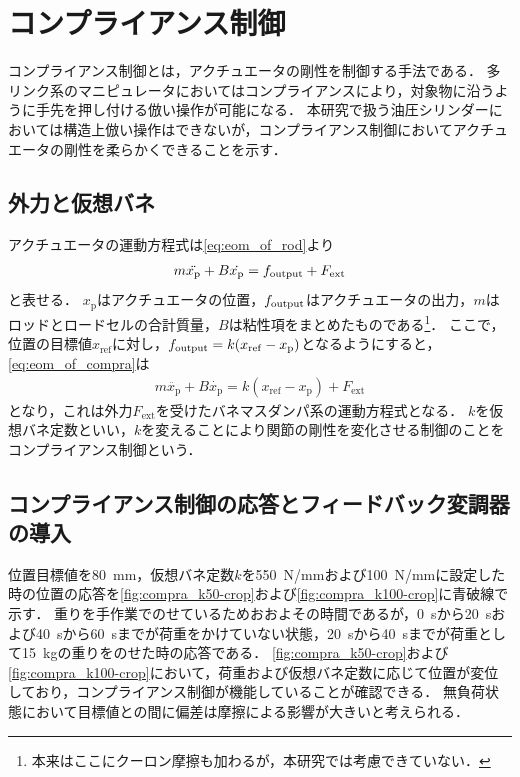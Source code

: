 \clearpage
\section{コンプライアンス制御}
コンプライアンス制御とは，アクチュエータの剛性を制御する手法である\cite{松野_大須賀_松原_野田_稲見201712,吉川198811,谷江和雄1989コンプライアンス制御と柔軟接触問題}．
多リンク系のマニピュレータにおいてはコンプライアンスにより，対象物に沿うように手先を押し付ける倣い操作が可能になる．
本研究で扱う油圧シリンダーにおいては構造上倣い操作はできないが，コンプライアンス制御においてアクチュエータの剛性を柔らかくできることを示す．
\subsection{外力と仮想バネ}
アクチュエータの運動方程式は\eqnname\ref{eq:eom_of_rod}より
\begin{align}
    \label{eq:eom_of_compra}
    m\ddot{x_\mathrm{p}} + B\dot{x_\mathrm{p}} = f_\mathrm{output} +F_\mathrm{ext}
\end{align}
と表せる．
$x_\mathrm{p}$はアクチュエータの位置，$f_\mathrm{output}$はアクチュエータの出力，$m$はロッドとロードセルの合計質量，$B$は粘性項をまとめたものである\footnote{本来はここにクーロン摩擦も加わるが，本研究では考慮できていない．}．
ここで，位置の目標値$x_\mathrm{ref}$に対し，$f_\mathrm{output} = k(x_\mathrm{ref}-x_\mathrm{p})$となるようにすると，\eqnname\ref{eq:eom_of_compra}は
\begin{align}
    \label{eq:hoge}
    m\ddot{x_\mathrm{p}} + B\dot{x_\mathrm{p}} = k(x_\mathrm{ref}-x_\mathrm{p}) +F_\mathrm{ext}
\end{align}
となり，これは外力$F_\mathrm{ext}$を受けたバネマスダンパ系の運動方程式となる．
$k$を仮想バネ定数といい，$k$を変えることにより関節の剛性を変化させる制御のことをコンプライアンス制御という．

\subsection{コンプライアンス制御の応答とフィードバック変調器の導入}
位置目標値を\SI{80}{mm}，仮想バネ定数$k$を5\SI{50}{N/mm}および\SI{100}{N/mm}に設定した時の位置の応答を\figname\ref{fig:compra_k50-crop}および\figname\ref{fig:compra_k100-crop}に青破線で示す．
重りを手作業でのせているためおおよその時間であるが，\SI{0}{s}から\SI{20}{s}および\SI{40}{s}から\SI{60}{s}までが荷重をかけていない状態，\SI{20}{s}から\SI{40}{s}までが荷重として\SI{15}{kg}の重りをのせた時の応答である．
\figname\ref{fig:compra_k50-crop}および\figname\ref{fig:compra_k100-crop}において，荷重および仮想バネ定数に応じて位置が変位しており，コンプライアンス制御が機能していることが確認できる．
無負荷状態において目標値との間に偏差は摩擦による影響が大きいと考えられる．


